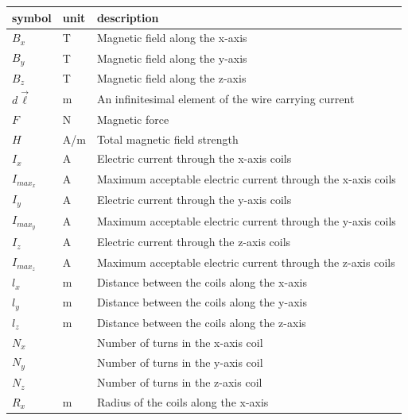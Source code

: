 \documentclass[12pt]{article}
\begin{document}
\renewcommand{\arraystretch}{1.2}
\noindent \begin{longtable*}{l l p{12cm}} \toprule
\textbf{symbol} & \textbf{unit} & \textbf{description}\\
\midrule 
$B_x$ & \si[per-mode=symbol]{\tesla} & Magnetic field along the x-axis \\
$B_y$ & \si[per-mode=symbol]{\tesla} & Magnetic field along the y-axis \\
$B_z$ & \si[per-mode=symbol]{\tesla} & Magnetic field along the z-axis \\
$d\vec{\ell}$ & \si[per-mode=symbol]{\meter} & An infinitesimal element of the wire carrying current \\
$F$ & \si[per-mode=symbol]{\newton} & Magnetic force \\
$H$ & \si[per-mode=symbol]{\ampere\per\metre} & Total magnetic field strength \\
$I_x$ & \si[per-mode=symbol]{\ampere} & Electric current through the x-axis coils \\
$I_{{max}_x}$ & \si[per-mode=symbol]{\ampere} & Maximum acceptable electric current through the x-axis coils \\
$I_y$ & \si[per-mode=symbol]{\ampere} & Electric current through the y-axis coils \\
$I_{{max}_y}$ & \si[per-mode=symbol]{\ampere} & Maximum acceptable electric current through the y-axis coils \\
$I_z$ & \si[per-mode=symbol]{\ampere} & Electric current through the z-axis coils \\
$I_{{max}_z}$ & \si[per-mode=symbol]{\ampere} & Maximum acceptable electric current through the z-axis coils \\
$l_x$ & \si[per-mode=symbol]{\metre} & Distance between the coils along the x-axis \\
$l_y$ & \si[per-mode=symbol]{\metre} & Distance between the coils along the y-axis \\
$l_z$ & \si[per-mode=symbol]{\metre} & Distance between the coils along the z-axis \\
$N_x$ & & Number of turns in the x-axis coil \\
$N_y$ & & Number of turns in the y-axis coil \\
$N_z$ & & Number of turns in the z-axis coil \\
$R_x$ & \si[per-mode=symbol]{\metre} & Radius of the coils along the x-axis \\

\end{longtable*}
\end{document}

